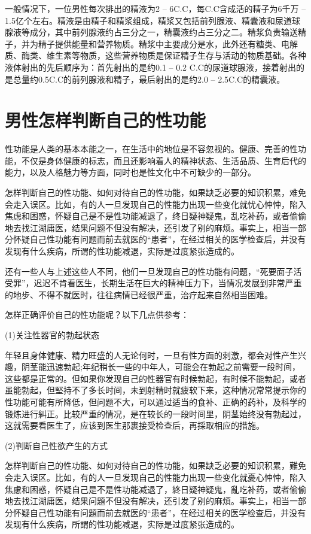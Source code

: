 \documentclass[12pt,UTF8]{ctexbook}
\begin{document}
一般情况下，一位男性每次排出的精液为2 -- 6C.C，每C.C含成活的精子为6千万 -- 1.5亿个左右。精液是由精子和精浆组成，精浆又包括前列腺液、精囊液和尿道球腺液等成分，其中前列腺液约占三分之一，精囊液约占三分之二。精浆负责输送精子，并为精子提供能量和营养物质。精浆中主要成分是水，此外还有糖类、电解质、酶类、维生素等物质，这些营养物质是保证精子生存与活动的物质基础。各种液体射出的先后顺序为：首先射出的是约0.1 -- 0.2 C.C的尿道球腺液，接着射出的是总量约0.5C.C的前列腺液和精子，最后射出的是约2.0 -- 2.5C.C的精囊液。

\section{男性怎样判断自己的性功能}

性功能是人类的基本本能之一，在生活中的地位是不容忽视的。健康、完善的性功能，不仅是身体健康的标志，而且还影响着人的精神状态、生活品质、生育后代的能力，以及人格魅力等方面，同时也是性文化中不可缺少的一部分。

怎样判断自己的性功能、如何对待自己的性功能，如果缺乏必要的知识积累，难免会走入误区。比如，有的人一旦发现自己的性能力出现一些变化就忧心忡忡，陷入焦虑和困惑，怀疑自己是不是性功能减退了，终日疑神疑鬼，乱吃补药，或者偷偷地去找江湖庸医，结果问题不但没有解决，还引发了别的麻烦。事实上，相当一部分怀疑自己性功能有问题而前去就医的“患者”，在经过相关的医学检查后，并没有发现有什么疾病，所谓的性功能减退，实际是过度紧张造成的。

还有一些人与上述这些人不同，他们一旦发现自己的性功能有问题，“死要面子活受罪”，迟迟不肯看医生，长期生活在巨大的精神压力下，当情况发展到非常严重的地步、不得不就医时，往往病情已经很严重，治疗起来自然相当困难。

怎样正确评价自己的性功能呢？以下几点供参考：

(1)关注性器官的勃起状态

年轻且身体健康、精力旺盛的人无论何时，一旦有性方面的刺激，都会对性产生兴趣，阴茎能迅速勃起;年纪稍长一些的中年人，可能会在勃起之前需要一段时间，这些都是正常的。但如果你发现自己的性器官有时候勃起，有时候不能勃起，或者虽能勃起，但堅持不了多长时间，未到射精时就疲软下来，这种情况常常提示你的性功能可能有所降低，但问题不大，可以通过适当的食补、正确的药补，及科学的锻炼进行糾正。比较严重的情况，是在较长的一段时间里，阴茎始终没有勃起过，这就需要看医生了，应该到医生那裹接受检查后，再採取相应的措施。

(2)判断自己性欲产生的方式

怎样判断自己的性功能、如何对待自己的性功能，如果缺乏必要的知识积累，難免会走入误区。比如，有的人一旦发现自己的性能力出现一些变化就憂心忡忡，陷入焦慮和困惑，怀疑自己是不是性功能减退了，終日疑神疑鬼，亂吃补药，或者偷偷地去找江湖庸医，结果问題不但没有解决，还引发了别的麻煩。事实上，相当一部分怀疑自己性功能有问題而前去就医的“患者”，在经过相关的医学检查后，并没有发现有什么疾病，所謂的性功能减退，实际是过度紧张造成的。
\end{document}

